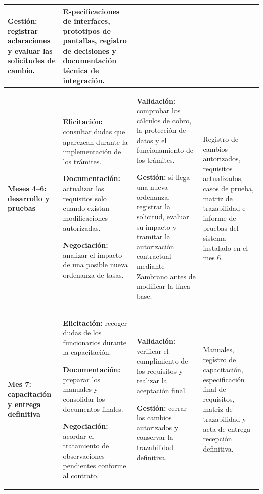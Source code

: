 \documentclass[12pt,a4paper]{article}
\begin{document}
\begin{longtable}{
>{\raggedright\arraybackslash}p{2.3cm}
>{\raggedright\arraybackslash}p{4.2cm}
>{\raggedright\arraybackslash}p{4.2cm}
>{\raggedright\arraybackslash}p{4.2cm}
}
\par\medskip
\textbf{Gestión:} registrar aclaraciones
y evaluar las solicitudes de cambio. &
Especificaciones de interfaces, prototipos
de pantallas, registro de decisiones y
documentación técnica de integración. \\
\midrule

\textbf{Meses 4--6: desarrollo y pruebas} &
\textbf{Elicitación:} consultar dudas que aparezcan
durante la implementación de los trámites.

\par\medskip
\textbf{Documentación:} actualizar los requisitos
solo cuando existan modificaciones autorizadas.

\par\medskip
\textbf{Negociación:} analizar el impacto de
una posible nueva ordenanza de tasas. &
\textbf{Validación:} comprobar los cálculos de cobro,
la protección de datos y el funcionamiento
de los trámites.

\par\medskip
\textbf{Gestión:} si llega una nueva ordenanza,
registrar la solicitud, evaluar su impacto
y tramitar la autorización contractual mediante
Zambrano antes de modificar la línea base. &
Registro de cambios autorizados, requisitos
actualizados, casos de prueba, matriz de
trazabilidad e informe de pruebas del sistema
instalado en el mes 6. \\
\midrule

\textbf{Mes 7: capacitación y entrega definitiva} &
\textbf{Elicitación:} recoger dudas de los
funcionarios durante la capacitación.

\par\medskip
\textbf{Documentación:} preparar los manuales
y consolidar los documentos finales.

\par\medskip
\textbf{Negociación:} acordar el tratamiento
de observaciones pendientes conforme al contrato. &
\textbf{Validación:} verificar el cumplimiento
de los requisitos y realizar la aceptación final.

\par\medskip
\textbf{Gestión:} cerrar los cambios autorizados
y conservar la trazabilidad definitiva. &
Manuales, registro de capacitación,
especificación final de requisitos,
matriz de trazabilidad y acta de
entrega-recepción definitiva. \\

\bottomrule
\end{longtable}
\endgroup
\end{document}
